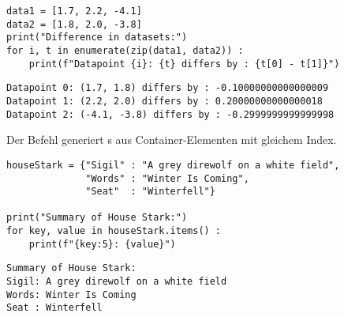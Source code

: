 \begin{frame}[fragile]
%
\begin{codebox}
\begin{verbatim}
data1 = [1.7, 2.2, -4.1]
data2 = [1.8, 2.0, -3.8]
print("Difference in datasets:")
for i, t in enumerate(zip(data1, data2)) :
    print(f"Datapoint {i}: {t} differs by : {t[0] - t[1]}")
\end{verbatim}
\end{codebox}
%
\begin{cmdbox}
\begin{verbatim}
Datapoint 0: (1.7, 1.8) differs by : -0.10000000000000009
Datapoint 1: (2.2, 2.0) differs by : 0.20000000000000018
Datapoint 2: (-4.1, -3.8) differs by : -0.2999999999999998
\end{verbatim}
\end{cmdbox}
%
\begin{hintbox}
Der Befehl  generiert s aus Container-Elementen mit gleichem Index.
\end{hintbox}
%
\end{frame}


\begin{frame}[fragile]
%
\begin{codebox}
\begin{verbatim}
houseStark = {"Sigil" : "A grey direwolf on a white field",
              "Words" : "Winter Is Coming",
              "Seat"  : "Winterfell"}

print("Summary of House Stark:")
for key, value in houseStark.items() :
    print(f"{key:5}: {value}")
\end{verbatim}
\end{codebox}
%
\begin{cmdbox}
\begin{verbatim}
Summary of House Stark:
Sigil: A grey direwolf on a white field
Words: Winter Is Coming
Seat : Winterfell
\end{verbatim}
\end{cmdbox}
%
\end{frame}

